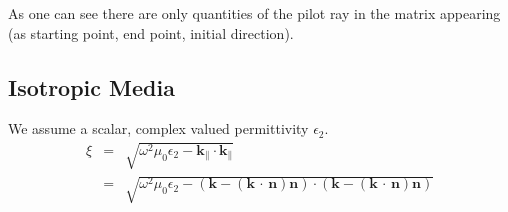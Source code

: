 \documentclass[12pt,a4paper,twoside,openright,BCOR10mm,headsepline,titlepage,abstracton,chapterprefix,final]{scrreprt}
\newcommand\Vector[1]{{\mathbf{#1}}}
\newcommand\vacuum{0}
\newcommand\wavenumber{k}
\newcommand\Wavevector{\Vector{\wavenumber}}
\newcommand{\scpm}[2]{(#1\,\cdot\,#2)}
\newcommand\vacuumpermeability{\mu_{\vacuum}}
\newcommand\scalarpermittivity{\epsilon}
\begin{document}
As one can see there are only quantities of the pilot ray in the matrix appearing (as starting point, end point, initial direction).

\subsection{Isotropic Media}
We assume a scalar, complex valued permittivity $\scalarpermittivity_2$.
\begin{eqnarray}
 \xi &=& \sqrt{\omega^2 \vacuumpermeability \scalarpermittivity_2 - \Wavevector_{\parallel} \cdot \Wavevector_{\parallel}} \nonumber\\
      &=& \sqrt{\omega^2 \vacuumpermeability \scalarpermittivity_2 - (\Vector{k} - \scpm{\Vector{k}}{\Vector{n}}\Vector{n}) \cdot (\Vector{k} - \scpm{\Vector{k}}{\Vector{n}}\Vector{n})}\\
\end{eqnarray}
\end{document}
